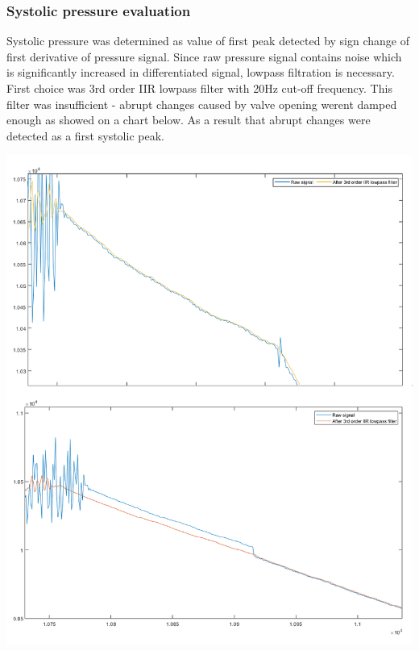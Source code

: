 \subsubsection*{Systolic pressure evaluation}

Systolic pressure was determined as value of first peak detected by sign change of first derivative of pressure signal. Since raw pressure signal contains noise which is significantly increased in differentiated signal, lowpass filtration is necessary. First choice was 3rd order I\+IR lowpass filter with 20Hz cut-\/off frequency. This filter was insufficient -\/ abrupt changes caused by valve opening weren\textquotesingle{}t damped enough as showed on a chart below. As a result that abrupt changes were detected as a first systolic peak. 
\begin{DoxyImage}
\includegraphics[width=\textwidth,height=\textheight/2,keepaspectratio=true]{SYSmeasurementProblem.png}
\end{DoxyImage}


